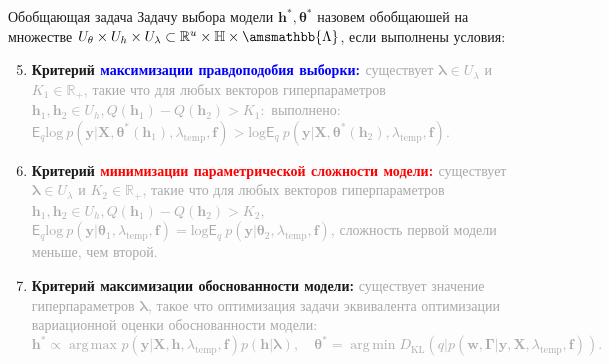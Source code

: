 \documentclass[usenames,dvipsnames,11pt,pdf,utf8,russian,aspectratio=43]{beamer}
\DeclareMathOperator*{\argmin}{arg\,min}
\DeclareMathOperator*{\argmax}{arg\,max}
\begin{document}
\begin{frame}{Обобщающая задача}
\footnotesize
Задачу выбора модели $\mathbf{h}^{*}, \boldsymbol{\theta}^{*}$ назовем обобщаюшей на множестве $U_{\theta}\times U_{h} \times U_{\lambda} \subset \mathbb{R}^{u} \times \mathbb{H} \times \amsmathbb{\Lambda}$, если выполнены условия:
\begin{enumerate}
\setcounter{enumi}{4}
\item \textbf{Критерий \textcolor{blue}{максимизации правдоподобия выборки: }}\textcolor{darkgray}{ существует $\boldsymbol{\lambda} \in U_{\lambda}$ и  $K_1 \in \mathbb{R}_{+}$, такие что для любых векторов гиперпараметров $\mathbf{h}_1, \mathbf{h}_2 \in  U_{h}, Q(\mathbf{h}_1) - Q(\mathbf{h}_2) > K_1:$ выполнено: $\mathsf{E}_q \text{log}~p(\mathbf{y}|\mathbf{X}, \boldsymbol{\theta}^{*}(\mathbf{h}_1), \lambda_{\text{temp}}, \mathbf{f})>\text{log}\mathsf{E}_q ~p(\mathbf{y}|\mathbf{X}, \boldsymbol{\theta}^{*}(\mathbf{h}_2), \lambda_{\text{temp}}, \mathbf{f})$.}

\item \textbf{Критерий \textcolor{red}{минимизации параметрической сложности модели: }}\textcolor{darkgray}{ существует  $\boldsymbol{\lambda} \in U_{\lambda}$ и $K_2 \in \mathbb{R}_{+}$, такие что для любых векторов гиперпараметров $\mathbf{h}_1, \mathbf{h}_2 \in U_h, Q(\mathbf{h}_1) - Q(\mathbf{h}_2) > K_2$,  $\mathsf{E}_q \text{log}~p(\mathbf{y}|\boldsymbol{\theta}_1, \lambda_{\text{temp}}, \mathbf{f}) = \text{log}\mathsf{E}_q ~p(\mathbf{y}|\boldsymbol{\theta}_2, \lambda_{\text{temp}}, \mathbf{f})$, сложность первой модели меньше, чем второй.}

\item \textbf{Критерий максимизации обоснованности модели: }\textcolor{darkgray}{ существует значение гиперпараметров $\boldsymbol{\lambda}$, такое что оптимизация задачи эквивалента оптимизации вариационной оценки обоснованности модели:
\vspace{-0.2cm}
\[
    \mathbf{h}^{*} \propto \argmax_{} p(\mathbf{y}|\mathbf{X}, \mathbf{h}, \lambda_{\text{temp}}, \mathbf{f})p(\mathbf{h}|\boldsymbol{\lambda}),\quad
    \boldsymbol{\theta}^{*} = \argmin D_\text{KL}(q| p(\mathbf{w}, \boldsymbol{\Gamma}|\mathbf{y}, \mathbf{X}, \lambda_{\text{temp}}, \mathbf{f})).
\]}
\vspace{-0.6cm}
\end{enumerate}
\end{frame}
\end{document}
